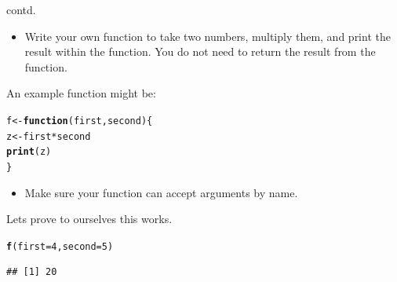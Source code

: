 \documentclass{beamer}\usepackage[]{graphicx}\usepackage[]{color}
\makeatletter
\newcommand{\hlnum}[1]{\textcolor[rgb]{0.686,0.059,0.569}{#1}}%
\newcommand{\hlopt}[1]{\textcolor[rgb]{0,0,0}{#1}}%
\newcommand{\hlstd}[1]{\textcolor[rgb]{0.345,0.345,0.345}{#1}}%
\newcommand{\hlkwa}[1]{\textcolor[rgb]{0.161,0.373,0.58}{\textbf{#1}}}%
\newcommand{\hlkwb}[1]{\textcolor[rgb]{0.69,0.353,0.396}{#1}}%
\newcommand{\hlkwc}[1]{\textcolor[rgb]{0.333,0.667,0.333}{#1}}%
\newcommand{\hlkwd}[1]{\textcolor[rgb]{0.737,0.353,0.396}{\textbf{#1}}}%
\newenvironment{kframe}{%
 \def\at@end@of@kframe{}%
 \ifinner\ifhmode%
  \def\at@end@of@kframe{\end{minipage}}%
  \begin{minipage}{\columnwidth}%
 \fi\fi%
 \def\FrameCommand##1{\hskip\@totalleftmargin \hskip-\fboxsep
 \colorbox{shadecolor}{##1}\hskip-\fboxsep
     \hskip-\linewidth \hskip-\@totalleftmargin \hskip\columnwidth}%
 \MakeFramed {\advance\hsize-\width
   \@totalleftmargin\z@ \linewidth\hsize
   \@setminipage}}%
 {\par\unskip\endMakeFramed%
 \at@end@of@kframe}
\newenvironment{knitrout}{}{} %
\makeatother
\begin{document}
\begin{frame}[fragile]{contd.}



\begin{itemize}
\item Write your own function to take two numbers, multiply them, and print the result within the function. You do not need to return the result from the function.
\end{itemize}
An example function might be:
\begin{knitrout}
\color{fgcolor}\begin{kframe}
\begin{alltt}
\hlstd{f} \hlkwb{<-} \hlkwa{function}\hlstd{(}\hlkwc{first}\hlstd{,} \hlkwc{second}\hlstd{)\{}
\hlstd{z} \hlkwb{<-} \hlstd{first} \hlopt{*} \hlstd{second}
\hlkwd{print}\hlstd{(z)}
\hlstd{\}}
\end{alltt}
\end{kframe}
\end{knitrout}

\begin{itemize}
\item Make sure your function can accept arguments by name.
\end{itemize}
Lets prove to ourselves this works.
\begin{knitrout}
\color{fgcolor}\begin{kframe}
\begin{alltt}
\hlkwd{f}\hlstd{(}\hlkwc{first}\hlstd{=}\hlnum{4}\hlstd{,} \hlkwc{second}\hlstd{=}\hlnum{5}\hlstd{)}
\end{alltt}
\begin{verbatim}
## [1] 20
\end{verbatim}
\end{kframe}
\end{knitrout}

\end{frame}
\end{document}
